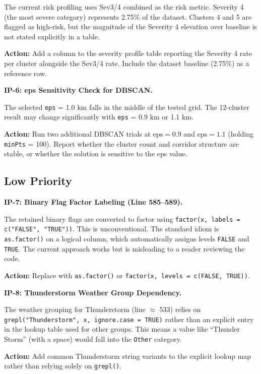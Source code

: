 \documentclass[11pt]{article}
\begin{document}
The current risk profiling uses Sev3/4 combined as the risk metric.
Severity 4 (the most severe category) represents 2.75\% of the dataset.
Clusters 4 and 5 are flagged as high-risk, but the magnitude of the
Severity 4 elevation over baseline is not stated explicitly in a table.

\textbf{Action:} Add a column to the severity profile table reporting the
Severity 4 rate per cluster alongside the Sev3/4 rate. Include the
dataset baseline (2.75\%) as a reference row.

\textbf{IP-6: eps Sensitivity Check for DBSCAN.}

The selected \texttt{eps} = 1.0 km falls in the middle of the tested grid.
The 12-cluster result may change significantly with \texttt{eps} = 0.9 km
or 1.1 km.

\textbf{Action:} Run two additional DBSCAN trials at $\text{eps} = 0.9$ and
$\text{eps} = 1.1$ (holding \texttt{minPts} = 100). Report whether the
cluster count and corridor structure are stable, or whether the solution
is sensitive to the eps value.

\subsection{Low Priority}

\textbf{IP-7: Binary Flag Factor Labeling (Line 585--589).}

The retained binary flags are converted to factor using
\texttt{factor(x, labels = c("FALSE", "TRUE"))}. This is unconventional.
The standard idiom is \texttt{as.factor()} on a logical column, which
automatically assigns levels \texttt{FALSE} and \texttt{TRUE}. The current
approach works but is misleading to a reader reviewing the code.

\textbf{Action:} Replace with \texttt{as.factor()} or
\texttt{factor(x, levels = c(FALSE, TRUE))}.

\textbf{IP-8: Thunderstorm Weather Group Dependency.}

The weather grouping for Thunderstorm (line $\approx$ 533) relies on
\texttt{grepl("Thunderstorm", x, ignore.case = TRUE)} rather than an explicit
entry in the lookup table used for other groups. This means a value like
``Thunder Storm'' (with a space) would fall into the \texttt{Other} category.

\textbf{Action:} Add common Thunderstorm string variants to the explicit lookup
map rather than relying solely on \texttt{grepl()}.

\end{document}
